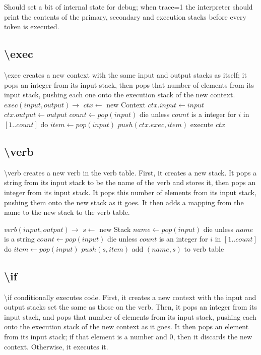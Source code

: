 \documentclass{article}
\let\bs\textbackslash
\def\pc{\bigskip\obeylines\parindent=0pt}
\begin{document}
{{{{{Should set a bit of internal state for debug; when trace=1 the interpreter should print the contents of the primary, secondary and execution stacks before every token is executed.

\subsection{\bs exec}

\bs exec creates a new context with the same input and output stacks as itself; it pops an integer from its input stack, then pops that number of elements from its input stack, pushing each one onto the execution stack of the new context.
{\pc
$exec(input, output) \rightarrow$
\quad $ctx \leftarrow$ new Context
\quad $ctx.input \leftarrow input$
\quad $ctx.output \leftarrow output$
\quad $count \leftarrow pop(input)$
\quad die unless $count$ is a integer
\quad for $i$ in $[1..count]$ do
\quad \quad $item \leftarrow pop(input)$
\quad \quad $push(ctx.exec, item)$
\quad execute $ctx$
}

\subsection{\bs verb}

\bs verb creates a new verb in the verb table.  First, it creates a new stack.  It pops a string from its input stack to be the name of the verb and stores it, then pops an integer from its input stack.  It pops this number of elements from its input stack, pushing them onto the new stack as it goes.  It then adds a mapping from the name to the new stack to the verb table.

{\pc
$verb(input,output) \rightarrow$
\quad $s \leftarrow$ new Stack
\quad $name \leftarrow pop(input)$
\quad die unless $name$ is a string
\quad $count \leftarrow pop(input)$
\quad die unless $count$ is an integer
\quad for $i$ in $[1..count]$ do
\quad \quad $item \leftarrow pop(input)$
\quad \quad $push(s, item)$
\quad add $(name, s)$ to verb table
}

\subsection{\bs if}

\bs if conditionally executes code.  First, it creates a new context with the input and output stacks set the same as those on the verb.  Then, it pops an integer from its input stack, and pops that number of elements from its input stack, pushing each onto the execution stack of the new context as it goes.  It then pops an element from its input stack; if that element is a number and 0, then it discards the new context.  Otherwise, it executes it.

}}}}}
\end{document}
